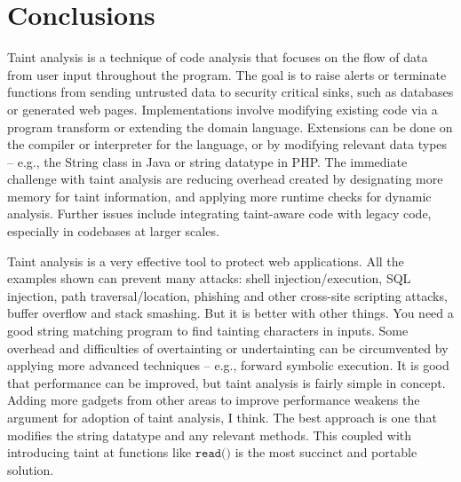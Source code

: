 \documentclass[11pt]{article}
\begin{document}

%
%
%
%
%

\section*{Conclusions}

Taint analysis is a technique of code analysis that focuses on the flow of data
from user input throughout the program. The goal is to raise alerts or terminate 
functions from sending untrusted data to security critical sinks, such as databases 
or generated web pages. Implementations involve modifying existing code via a program
transform or extending the domain language. Extensions can be done on the compiler or 
interpreter for the language, or by modifying relevant data types -- e.g., the String 
class in Java or string datatype in PHP. The immediate challenge with taint
analysis are reducing overhead created by designating more memory for taint information, 
and applying more runtime checks for dynamic analysis. Further issues include 
integrating taint-aware code with legacy code, especially in codebases at larger scales.

Taint analysis is a very effective tool to protect web applications.
All the examples shown can prevent many attacks: shell injection/execution,
SQL injection, path traversal/location, phishing and other cross-site scripting attacks,
buffer overflow and stack smashing. But it is better with other things. You need
a good string matching program to find tainting characters in inputs. Some overhead
and difficulties of overtainting or undertainting can be circumvented by applying
more advanced techniques -- e.g., forward symbolic execution. It is good that 
performance can be improved, but taint analysis is fairly simple in concept.
Adding more gadgets from other areas to improve performance weakens the argument
for adoption of taint analysis, I think. The best approach is one that 
modifies the string datatype and any relevant methods. This coupled with introducing 
taint at functions like $\texttt{read()}$ is the most succinct and portable solution.
\end{document}
